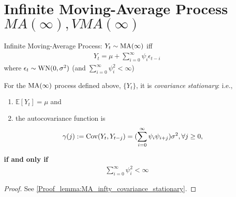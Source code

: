 \documentclass[11pt]{elegantbook}
\begin{document}
\section{Infinite Moving-Average Process $MA(\infty),VMA(\infty)$}
\begin{definition}
    Infinite Moving-Average Process: $Y_t\sim \textnormal{MA}(\infty)$ iff
        \begin{equation}
            \begin{aligned}
                Y_t=\mu+\sum_{i=0}^{\infty}\psi_i\epsilon_{t-i}
            \end{aligned}
            \nonumber
        \end{equation}
        where $\epsilon_t\sim \textnormal{WN}(0,\sigma^2)$ (and \underline{$\sum_{i=0}^{\infty}\psi_i^2<\infty$})
\end{definition}
\begin{lemma}[$\sum_{i=0}^{\infty}\psi_i^2<\infty$ is required for covariance stationarity]\label{lemma:MA_infty_covariance_stationary}
    For the $\textnormal{MA}(\infty)$ process defined above, $\{Y_t\}$, it is \textit{covariance stationary}: i.e.,
    \begin{enumerate}
        \item $\mathbb{E}[Y_t]=\mu$ and
        \item the autocovariance function is $$\gamma(j):=\textnormal{Cov}(Y_t,Y_{t-j})=(\sum_{i=0}^{\infty}\psi_i\psi_{i+j})\sigma^2,\forall j\geq 0,$$
    \end{enumerate}
    \textbf{if and only if}
    \begin{equation}
        \begin{aligned}
            \sum_{i=0}^{\infty}\psi_i^2<\infty
        \end{aligned}
        \nonumber
    \end{equation}
\end{lemma}
\begin{proof}
    See \ref{Proof_lemma:MA_infty_covariance_stationary}.
\end{proof}
\end{document}
